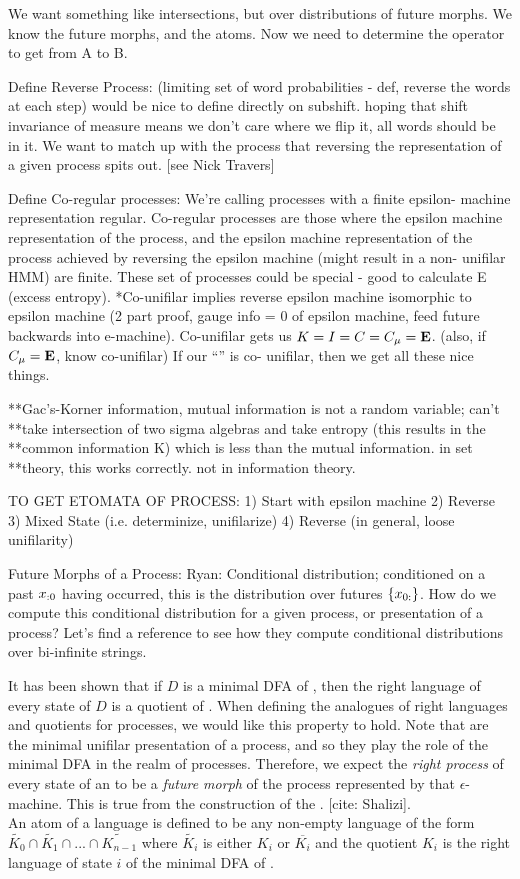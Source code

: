 \documentclass[prl,twocolumn,showpacs,superscriptaddress,preprintnumbers,floatfix]{revtex4-1}
\theoremstyle{plain}    \newtheorem{Lem}{Lemma}
\theoremstyle{plain}    \newtheorem*{ProLem}{Proof}
\theoremstyle{plain}    \newtheorem{Cor}{Corollary}
\theoremstyle{plain}    \newtheorem*{ProCor}{Proof}
\theoremstyle{plain}    \newtheorem{The}{Theorem}
\theoremstyle{plain}    \newtheorem*{ProThe}{Proof}
\theoremstyle{plain}    \newtheorem{Prop}{Proposition}
\theoremstyle{plain}    \newtheorem*{ProProp}{Proof}
\theoremstyle{plain}    \newtheorem*{Conj}{Conjecture}
\theoremstyle{plain}    \newtheorem*{Rem}{Remark}
\theoremstyle{plain}    \newtheorem{Def}{Definition}
\theoremstyle{plain}    \newtheorem*{Not}{Notation}
\begin{document}
We want something like intersections, but over distributions of future morphs.
We know the future morphs, and the atoms.  Now we need to determine the operator
to get from A to B.

Define Reverse Process: (limiting set of word probabilities - def, reverse the
words at each step) would be nice to define directly on subshift. hoping that
shift invariance of measure means we don't care where we flip it, all words
should be in it.  We want to match up with the process that reversing the
\eM representation of a given process spits out. [see Nick Travers]

Define Co-regular processes: We're calling processes with a finite epsilon-
machine representation regular. Co-regular processes are those where the epsilon
machine representation of the process, and the epsilon machine representation of
the process achieved by reversing the epsilon machine (might result in a non-
unifilar HMM) are finite.  These set of processes could be special - good to
calculate E (excess entropy).  *Co-unifilar implies reverse epsilon machine
isomorphic to epsilon machine (2 part proof, gauge info = 0 of epsilon machine,
feed future backwards into e-machine). Co-unifilar gets us $K = I = C = C_\mu
= {\bf E}$.  (also, if $C_\mu = {\bf E}$, know co-unifilar) If our ``\eT'' is co-
unifilar, then we get all these nice things.

**Gac's-Korner information, mutual information is not a random variable; can't
**take intersection of two sigma algebras and take entropy (this results in the
**common information K) which is less than the mutual information. in set
**theory, this works correctly. not in information theory.

TO GET ETOMATA OF PROCESS:
1) Start with epsilon machine
2) Reverse
3) Mixed State (i.e. determinize, unifilarize)
4) Reverse (in general, loose unifilarity)

Future Morphs of a Process: Ryan: Conditional distribution; conditioned on a
past ${x}_{:0}$ having occurred, this is the distribution over futures $\{
{x}_{0:}\}$. How do we compute this conditional distribution for a given
process, or presentation of a process? Let's find a reference to see how they
compute conditional distributions over bi-infinite strings.

It has been shown that if $D$ is a minimal DFA of \Language, then the right
language of every state of $D$ is a quotient of \Language.  When defining the
analogues of right languages and quotients for processes, we would like this
property to hold.  Note that \eM are the minimal unifilar
presentation of a process, and so they play the role of the minimal DFA in the
realm of processes.  Therefore, we expect the \emph{right process} of every
state of an \eM to be a \emph{future morph} of the process
represented by that $\epsilon$-machine.  This is true from the construction of
the \eM. [cite: Shalizi]. \\ An atom of a language \Language is
defined to be any non-empty language of the form $\widetilde{K_0} \cap
\widetilde{K_1} \cap ... \cap \widetilde{K_{n-1}}$ where $\widetilde{K_i}$ is
either $K_i$ or $\overline{K_i}$ and the quotient $K_i$ is the right language of
state $i$ of the minimal DFA of \Language.
\end{document}
